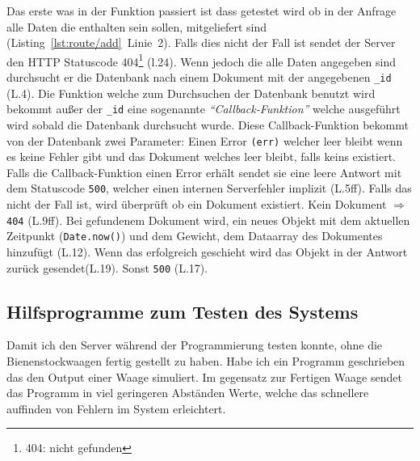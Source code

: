 \documentclass[a4paper, ngerman, 12pt]{scrartcl}
\newcommand{\js}[1]{\texttt{#1}}
\begin{document}
Das erste was in der Funktion passiert ist dass getestet wird ob in der Anfrage alle Daten die enthalten sein sollen, mitgeliefert sind (Listing~\autoref{lst:route/add}~Linie~2).
Falls dies nicht der Fall ist sendet der Server den HTTP Statuscode 404\footnote{404: nicht gefunden} (l.24).
Wenn jedoch die alle Daten angegeben sind durchsucht er die Datenbank nach einem Dokument mit der angegebenen \js{_id} (L.4).
Die Funktion welche zum Durchsuchen der Datenbank benutzt wird bekommt außer der \js{_id} eine sogenannte \emph{\enquote{Callback-Funktion}} welche ausgeführt wird sobald die Datenbank durchsucht wurde.
Diese Callback-Funktion bekommt von der Datenbank zwei Parameter: Einen Error \js{(err)} welcher leer bleibt wenn es keine Fehler gibt und das Dokument welches leer bleibt, falls keins existiert. 
Falls die Callback-Funktion einen Error erhält sendet sie eine leere Antwort mit dem Statuscode \texttt{500}, welcher einen internen Serverfehler implizit (L.5ff). Falls das nicht der Fall ist, wird überprüft ob ein Dokument existiert. Kein Dokument $\Rightarrow$ \texttt{404} (L.9ff). Bei gefundenem Dokument wird, ein neues Objekt mit dem aktuellen Zeitpunkt (\js{Date.now()}) und dem Gewicht, dem Dataarray des Dokumentes hinzufügt (L.12). Wenn das erfolgreich geschieht wird das Objekt in der Antwort zurück gesendet(L.19). Sonst \texttt{500} (L.17).

\subsection[Tests]{Hilfsprogramme zum Testen des Systems} %

Damit ich den Server während der Programmierung testen konnte, ohne die Bienenstockwaagen fertig gestellt zu haben. Habe ich ein Programm geschrieben das den Output einer Waage simuliert. Im gegensatz zur Fertigen Waage sendet das Programm in viel geringeren Abständen Werte, welche das schnellere auffinden von Fehlern im System erleichtert.
\clearpage{}
\printbibheading{}
\printbibliography[type=book,heading=subbibliography,title={Buch Quellen}]
\printbibliography[type=misc,heading=subbibliography,title={Internet Quellen}]
\end{document}
